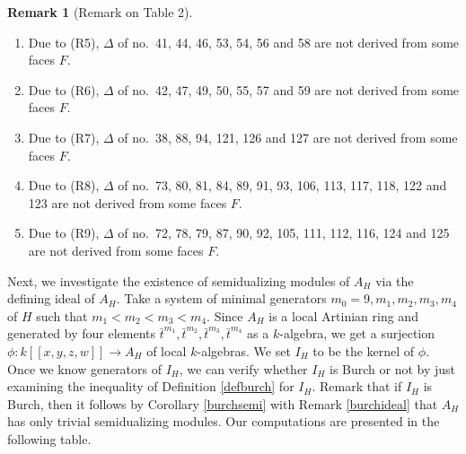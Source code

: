 \documentclass{amsart}
\theoremstyle{plain}
\theoremstyle{definition}
\newtheorem{remark}[theorem]{Remark}
\numberwithin{theorem}{section}
\numberwithin{equation}{section}
\numberwithin{equation}{theorem}
\begin{document}
\begin{remark}[Remark on Table 2]
\begin{enumerate}[ \rm(1)]
\item Due to (R5), $\Delta$ of no.\ 41, 44, 46, 53, 54, 56 and 58 are not derived from some faces $F$.
\item Due to (R6), $\Delta$ of no.\ 42, 47, 49, 50,  55, 57 and 59 are not derived from some faces $F$.
\item Due to (R7), $\Delta$ of no.\ 38, 88, 94, 121,  126 and 127 are not derived from some faces $F$.
\item Due to (R8), $\Delta$ of no.\ 73, 80, 81, 84, 89, 91, 93, 106, 113, 117, 118, 122 and 123 are not derived from some faces $F$.
\item Due to (R9), $\Delta$ of no.\ 72, 78, 79, 87,  90, 92, 105, 111, 112, 116, 124 and 125 are not derived from some faces $F$.
\end{enumerate}
\end{remark}

Next, we investigate the existence of semidualizing modules of $A_H$ via the defining ideal of $A_H$.
Take a system of minimal generators $m_0=9,m_1,m_2,m_3,m_4$ of $H$ such that $m_1<m_2<m_3<m_4$.
Since $A_H$ is a local Artinian ring and generated by four elements $\bar{t}^{m_1},\bar{t}^{m_2},\bar{t}^{m_3},\bar{t}^{m_4}$ as a $k$-algebra, we get a surjection $\phi \colon k[\![x,y,z,w]\!] \to A_H$ of local $k$-algebras.
We set $I_H$ to be the kernel of $\phi$.
Once we know generators of $I_H$, we can verify whether $I_H$ is Burch or not by just examining the inequality of Definition \ref{defburch} for $I_H$.
Remark that if $I_H$ is Burch, then it follows by Corollary \ref{burchsemi} with Remark \ref{burchideal} that $A_H$ has only trivial semidualizing modules.
Our computations are presented in the following table.
\end{document}
